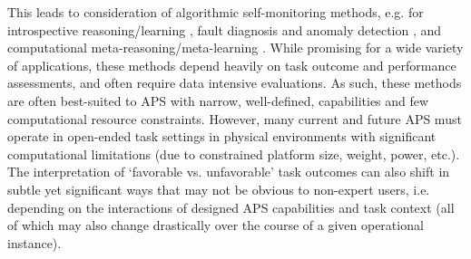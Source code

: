 This leads to consideration of algorithmic self-monitoring methods, e.g. for introspective reasoning/learning \cite{Huang2017-zt, Huang2017-lk,...}, fault diagnosis and anomaly detection \cite{...}, and computational meta-reasoning/meta-learning \cite{Griffiths,...}. 
While promising for a wide variety of applications, these methods depend heavily on task outcome and performance assessments, and often require data intensive evaluations. 
As such, these methods are often best-suited to APS with narrow, well-defined, capabilities and few computational resource constraints. 
However, many current and future APS must operate in open-ended task settings in physical environments with significant computational limitations (due to constrained platform size, weight, power, etc.). 
The interpretation of `favorable vs. unfavorable' task outcomes can also shift in subtle yet significant ways that may not be obvious to non-expert users, i.e. depending on the interactions of designed APS capabilities and task context (all of which may also change drastically over the course of a given operational instance). 



